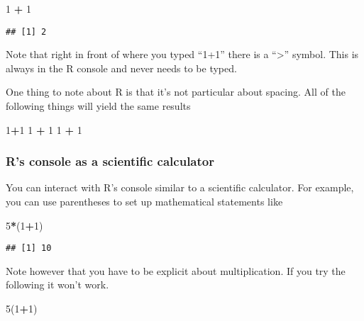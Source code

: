 \documentclass[]{book}
\newenvironment{Shaded}{\begin{snugshade}}{\end{snugshade}}
\newcommand{\DecValTok}[1]{\textcolor[rgb]{0.00,0.00,0.81}{#1}}
\newcommand{\StringTok}[1]{\textcolor[rgb]{0.31,0.60,0.02}{#1}}
\newcommand{\OperatorTok}[1]{\textcolor[rgb]{0.81,0.36,0.00}{\textbf{#1}}}
\newcommand{\NormalTok}[1]{#1}
\theoremstyle{definition}
\theoremstyle{definition}
\theoremstyle{definition}
\theoremstyle{remark}
\begin{document}
\begin{Shaded}
\begin{Highlighting}[]
\DecValTok{1} \OperatorTok{+}\StringTok{ }\DecValTok{1}
\end{Highlighting}
\end{Shaded}

\begin{verbatim}
## [1] 2
\end{verbatim}

Note that right in front of where you typed ``1+1'' there is a
``\textgreater{}'' symbol. This is always in the R console and never
needs to be typed.

One thing to note about R is that it's not particular about spacing. All
of the following things will yield the same results

\begin{Shaded}
\begin{Highlighting}[]
\DecValTok{1}\OperatorTok{+}\DecValTok{1}
\DecValTok{1} \OperatorTok{+}\StringTok{ }\DecValTok{1}
\DecValTok{1}          \OperatorTok{+}\StringTok{        }\DecValTok{1}
\end{Highlighting}
\end{Shaded}

\subsubsection{R's console as a scientific
calculator}\label{rs-console-as-a-scientific-calculator}

You can interact with R's console similar to a scientific calculator.
For example, you can use parentheses to set up mathematical statements
like

\begin{Shaded}
\begin{Highlighting}[]
\DecValTok{5}\OperatorTok{*}\NormalTok{(}\DecValTok{1}\OperatorTok{+}\DecValTok{1}\NormalTok{)}
\end{Highlighting}
\end{Shaded}

\begin{verbatim}
## [1] 10
\end{verbatim}

Note however that you have to be explicit about multiplication. If you
try the following it won't work.

\begin{Shaded}
\begin{Highlighting}[]
\DecValTok{5}\NormalTok{(}\DecValTok{1}\OperatorTok{+}\DecValTok{1}\NormalTok{)}
\end{Highlighting}
\end{Shaded}
\end{document}
